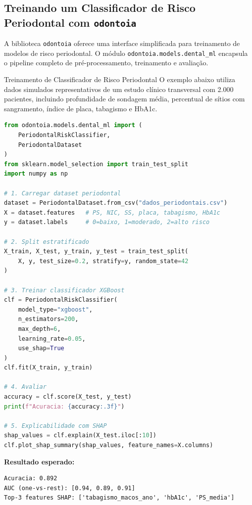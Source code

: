 \subsection{Treinando um Classificador de Risco Periodontal com \texttt{odontoia}}

A biblioteca \texttt{odontoia} oferece uma interface simplificada para treinamento de modelos de risco periodontal. O módulo \texttt{odontoia.models.dental\_ml} encapsula o pipeline completo de pré-processamento, treinamento e avaliação.

\begin{pratica}{Treinamento de Classificador de Risco Periodontal}
O exemplo abaixo utiliza dados simulados representativos de um estudo clínico transversal com 2.000 pacientes, incluindo profundidade de sondagem média, percentual de sítios com sangramento, índice de placa, tabagismo e HbA1c.

\begin{lstlisting}[language=Python, caption={Treinamento de classificador de risco periodontal com XGBoost}]
from odontoia.models.dental_ml import (
    PeriodontalRiskClassifier,
    PeriodontalDataset
)
from sklearn.model_selection import train_test_split
import numpy as np

# 1. Carregar dataset periodontal
dataset = PeriodontalDataset.from_csv("dados_periodontais.csv")
X = dataset.features   # PS, NIC, SS, placa, tabagismo, HbA1c
y = dataset.labels     # 0=baixo, 1=moderado, 2=alto risco

# 2. Split estratificado
X_train, X_test, y_train, y_test = train_test_split(
    X, y, test_size=0.2, stratify=y, random_state=42
)

# 3. Treinar classificador XGBoost
clf = PeriodontalRiskClassifier(
    model_type="xgboost",
    n_estimators=200,
    max_depth=6,
    learning_rate=0.05,
    use_shap=True
)
clf.fit(X_train, y_train)

# 4. Avaliar
accuracy = clf.score(X_test, y_test)
print(f"Acuracia: {accuracy:.3f}")

# 5. Explicabilidade com SHAP
shap_values = clf.explain(X_test.iloc[:10])
clf.plot_shap_summary(shap_values, feature_names=X.columns)
\end{lstlisting}

\textbf{Resultado esperado:}
\begin{lstlisting}[style=saida]
Acuracia: 0.892
AUC (one-vs-rest): [0.94, 0.89, 0.91]
Top-3 features SHAP: ['tabagismo_macos_ano', 'hbA1c', 'PS_media']
\end{lstlisting}
\end{pratica}

